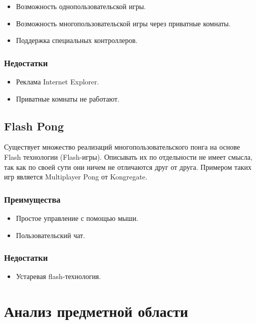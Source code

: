 \begin{itemize}
	\item Возможность однопользовательской игры.
	\item Возможность многопользовательской игры через приватные комнаты.
	\item Поддержка специальных контроллеров.
\end{itemize}

\subsubsection{Недостатки}

\begin{itemize}
	\item Реклама Internet Explorer.
	\item Приватные комнаты не работают.
\end{itemize}

\subsection{Flash Pong}

Существует множество реализаций многопользовательского понга на основе Flash технологии (Flash-игры). Описывать их по отдельности не имеет смысла, так как по своей сути они ничем не отличаются друг от друга. Примером таких игр является Multiplayer Pong от Kongregate\cite{KongreGatePong}.

\subsubsection{Преимущества}

\begin{itemize}
	\item Простое управление с помощью мыши.
	\item Пользовательский чат.
\end{itemize}

\subsubsection{Недостатки}

\begin{itemize}
	\item Устаревая flash-технология.
\end{itemize}

\section{Анализ предметной области}

